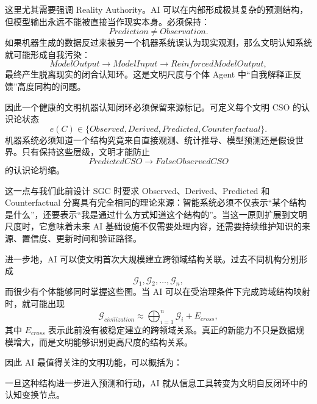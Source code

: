 这里尤其需要强调 Reality Authority。AI 可以在内部形成极其复杂的预测结构，但模型输出永远不能被直接当作现实本身。必须保持：
\begin{equation}
Prediction
\neq
Observation.
\end{equation}
如果机器生成的数据反过来被另一个机器系统误认为现实观测，那么文明认知系统就可能形成自我污染：
\begin{equation}
ModelOutput
\rightarrow
ModelInput
\rightarrow
ReinforcedModelOutput,
\end{equation}
最终产生脱离现实的闭合认知环。这是文明尺度与个体 Agent 中“自我解释正反馈”高度同构的问题。

因此一个健康的文明机器认知闭环必须保留来源标记。可定义每个文明 CSO 的认识论状态
\begin{equation}
e(C)
\in
\{
Observed,
Derived,
Predicted,
Counterfactual
\}.
\end{equation}
机器系统必须知道一个结构究竟来自直接观测、统计推导、模型预测还是假设世界。只有保持这些层级，文明才能防止
\begin{equation}
PredictedCSO
\rightarrow
FalseObservedCSO
\end{equation}
的认识论坍缩。

这一点与我们此前设计 SGC 时要求 Observed、Derived、Predicted 和 Counterfactual 分离具有完全相同的理论来源：智能系统必须不仅表示“某个结构是什么”，还要表示“我是通过什么方式知道这个结构的”。当这一原则扩展到文明尺度时，它意味着未来 AI 基础设施不仅需要处理内容，还需要持续维护知识的来源、置信度、更新时间和验证路径。

进一步地，AI 可以使文明首次大规模建立跨领域结构关联。过去不同机构分别形成
\begin{equation}
\mathcal{G}_1,\mathcal{G}_2,\ldots,\mathcal{G}_n,
\end{equation}
而很少有个体能够同时掌握这些图。当 AI 可以在受治理条件下完成跨域结构映射时，就可能出现
\begin{equation}
\mathcal{G}_{civilization}
\approx
\bigoplus_{i=1}^{n}
\mathcal{G}_i
+
E_{cross},
\end{equation}
其中 $E_{cross}$ 表示此前没有被稳定建立的跨领域关系。真正的新能力不只是数据规模增大，而是文明能够识别更高尺度的结构关系。

因此 AI 最值得关注的文明功能，可以概括为：
\begin{statementbox}
\centering
{}
\end{statementbox}
一旦这种结构进一步进入预测和行动，AI 就从信息工具转变为文明自反闭环中的认知变换节点。

